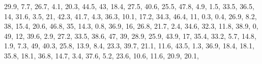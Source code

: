 \documentclass[]{book}
\newenvironment{Shaded}{\begin{snugshade}}{\end{snugshade}}
\newcommand{\DecValTok}[1]{\textcolor[rgb]{0.00,0.00,0.81}{#1}}
\newcommand{\FloatTok}[1]{\textcolor[rgb]{0.00,0.00,0.81}{#1}}
\newcommand{\NormalTok}[1]{#1}
\begin{document}
\begin{Shaded}
\begin{Highlighting}[]
    \FloatTok{29.9}\NormalTok{, }\FloatTok{7.7}\NormalTok{, }\FloatTok{26.7}\NormalTok{, }\FloatTok{4.1}\NormalTok{, }\FloatTok{20.3}\NormalTok{, }\FloatTok{44.5}\NormalTok{, }\DecValTok{43}\NormalTok{, }\FloatTok{18.4}\NormalTok{, }\FloatTok{27.5}\NormalTok{, }\FloatTok{40.6}\NormalTok{, }\FloatTok{25.5}\NormalTok{, }\FloatTok{47.8}\NormalTok{, }\FloatTok{4.9}\NormalTok{, }
    \FloatTok{1.5}\NormalTok{, }\FloatTok{33.5}\NormalTok{, }\FloatTok{36.5}\NormalTok{, }\DecValTok{14}\NormalTok{, }\FloatTok{31.6}\NormalTok{, }\FloatTok{3.5}\NormalTok{, }\DecValTok{21}\NormalTok{, }\FloatTok{42.3}\NormalTok{, }\FloatTok{41.7}\NormalTok{, }\FloatTok{4.3}\NormalTok{, }\FloatTok{36.3}\NormalTok{, }\FloatTok{10.1}\NormalTok{, }\FloatTok{17.2}\NormalTok{, }\FloatTok{34.3}\NormalTok{, }
    \FloatTok{46.4}\NormalTok{, }\DecValTok{11}\NormalTok{, }\FloatTok{0.3}\NormalTok{, }\FloatTok{0.4}\NormalTok{, }\FloatTok{26.9}\NormalTok{, }\FloatTok{8.2}\NormalTok{, }\DecValTok{38}\NormalTok{, }\FloatTok{15.4}\NormalTok{, }\FloatTok{20.6}\NormalTok{, }\FloatTok{46.8}\NormalTok{, }\DecValTok{35}\NormalTok{, }\FloatTok{14.3}\NormalTok{, }\FloatTok{0.8}\NormalTok{, }\FloatTok{36.9}\NormalTok{, }
    \DecValTok{16}\NormalTok{, }\FloatTok{26.8}\NormalTok{, }\FloatTok{21.7}\NormalTok{, }\FloatTok{2.4}\NormalTok{, }\FloatTok{34.6}\NormalTok{, }\FloatTok{32.3}\NormalTok{, }\FloatTok{11.8}\NormalTok{, }\FloatTok{38.9}\NormalTok{, }\DecValTok{0}\NormalTok{, }\DecValTok{49}\NormalTok{, }\DecValTok{12}\NormalTok{, }\FloatTok{39.6}\NormalTok{, }\FloatTok{2.9}\NormalTok{, }\FloatTok{27.2}\NormalTok{, }
    \FloatTok{33.5}\NormalTok{, }\FloatTok{38.6}\NormalTok{, }\DecValTok{47}\NormalTok{, }\DecValTok{39}\NormalTok{, }\FloatTok{28.9}\NormalTok{, }\FloatTok{25.9}\NormalTok{, }\FloatTok{43.9}\NormalTok{, }\DecValTok{17}\NormalTok{, }\FloatTok{35.4}\NormalTok{, }\FloatTok{33.2}\NormalTok{, }\FloatTok{5.7}\NormalTok{, }\FloatTok{14.8}\NormalTok{, }\FloatTok{1.9}\NormalTok{, }\FloatTok{7.3}\NormalTok{, }
    \DecValTok{49}\NormalTok{, }\FloatTok{40.3}\NormalTok{, }\FloatTok{25.8}\NormalTok{, }\FloatTok{13.9}\NormalTok{, }\FloatTok{8.4}\NormalTok{, }\FloatTok{23.3}\NormalTok{, }\FloatTok{39.7}\NormalTok{, }\FloatTok{21.1}\NormalTok{, }\FloatTok{11.6}\NormalTok{, }\FloatTok{43.5}\NormalTok{, }\FloatTok{1.3}\NormalTok{, }\FloatTok{36.9}\NormalTok{, }\FloatTok{18.4}\NormalTok{, }
    \FloatTok{18.1}\NormalTok{, }\FloatTok{35.8}\NormalTok{, }\FloatTok{18.1}\NormalTok{, }\FloatTok{36.8}\NormalTok{, }\FloatTok{14.7}\NormalTok{, }\FloatTok{3.4}\NormalTok{, }\FloatTok{37.6}\NormalTok{, }\FloatTok{5.2}\NormalTok{, }\FloatTok{23.6}\NormalTok{, }\FloatTok{10.6}\NormalTok{, }\FloatTok{11.6}\NormalTok{, }\FloatTok{20.9}\NormalTok{, }\FloatTok{20.1}\NormalTok{, }

\end{Highlighting}
\end{Shaded}
\end{document}
